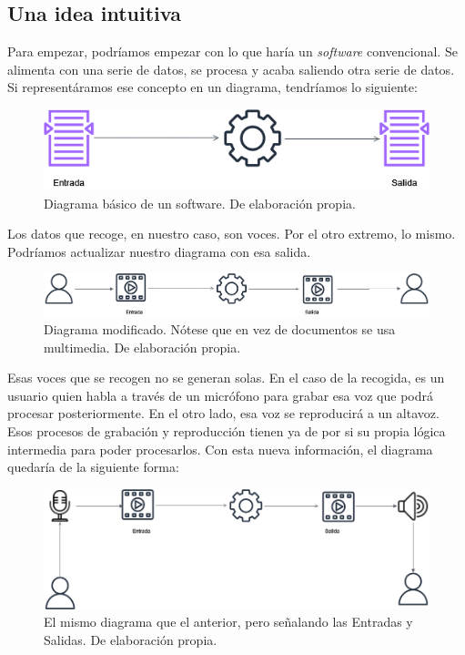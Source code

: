 \subsection{Una idea intuitiva}
Para empezar, podríamos empezar con lo que haría un \textit{software} convencional. Se alimenta con una serie de datos, se procesa y acaba saliendo otra serie de datos. Si representáramos ese concepto en un diagrama, tendríamos lo siguiente:

\begin{figure}[H]
	\centering
	\includegraphics[width=\textwidth]{imagenes/DiagramaBase.png}
	\caption{Diagrama básico de un software. De elaboración propia.}
\end{figure}

Los datos que recoge, en nuestro caso, son voces. Por el otro extremo, lo mismo. Podríamos actualizar nuestro diagrama con esa salida.

\begin{figure}[H]
	\centering
	\includegraphics[width=1.1\textwidth]{imagenes/DiagramaDatos.png}
	\caption[Diagrama modificado.]{Diagrama modificado. Nótese que en vez de documentos se usa multimedia. De elaboración propia.}
\end{figure}

Esas voces que se recogen no se generan solas. En el caso de la recogida, es un usuario quien habla a través de un micrófono para grabar esa voz que podrá procesar posteriormente. En el otro lado, esa voz se reproducirá a un altavoz. Esos procesos de grabación y reproducción tienen ya de por si su propia lógica intermedia para poder procesarlos. Con esta nueva información, el diagrama quedaría de la siguiente forma:

\begin{figure}[H]
	\centering
	\includegraphics[width=1.1\textwidth]{imagenes/DiagramaIO.png}
	\caption[Diagrama con E/S.]{El mismo diagrama que el anterior, pero señalando las Entradas y Salidas. De elaboración propia.}
\end{figure}


